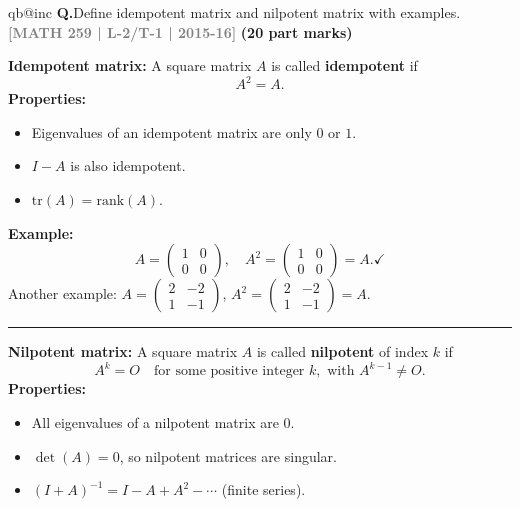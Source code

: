 \documentclass[12pt,a3paper]{article}
\makeatletter
\newcommand{\yr}[1]{\hfill\textcolor{gray}{\small\textbf{[#1]}}}
\newcommand{\mk}[1]{\textcolor{orange!70!black}{\small\textbf{(#1 marks)}}}
\newcounter{qnum}
\newcommand{\Q}[1]{%
  \csname qb@inc\endcsname
  \needspace{4\baselineskip}
  \refstepcounter{qnum}
  \vspace{6pt}
  \noindent\textbf{Q\theqnum.}\enspace #1\par
}
\makeatother
\begin{document}
\Q{Define idempotent matrix and nilpotent matrix with examples.
\yr{MATH 259 | L-2/T-1 | 2015-16} \mk{20 part}}

\begin{tcolorbox}[enhanced,breakable,
  colback=cA!4,colframe=cA,boxrule=0.8pt,arc=5pt,
  title={\textbf{Answer --- Idempotent and Nilpotent Matrices}},
  fonttitle=\bfseries\color{white},colbacktitle=cA]
 
\textbf{Idempotent matrix:} A square matrix $A$ is called \textbf{idempotent} if
\[
  A^2 = A.
\]
\textbf{Properties:}
\begin{itemize}[itemsep=2pt]
  \item Eigenvalues of an idempotent matrix are only $0$ or $1$.
  \item $I - A$ is also idempotent.
  \item $\mathrm{tr}(A) = \mathrm{rank}(A)$.
\end{itemize}
 
\textbf{Example:}
\[
  A = \begin{pmatrix}1 & 0 \\ 0 & 0\end{pmatrix}, \quad
  A^2 = \begin{pmatrix}1&0\\0&0\end{pmatrix} = A. \checkmark
\]
Another example: $A = \begin{pmatrix}2 & -2 \\ 1 & -1\end{pmatrix}$,
$A^2 = \begin{pmatrix}2&-2\\1&-1\end{pmatrix} = A$.
 
\medskip
\textcolor{cA}{\rule{\textwidth}{0.4pt}}
 
\textbf{Nilpotent matrix:} A square matrix $A$ is called \textbf{nilpotent} of index $k$ if
\[
  A^k = O \quad \text{for some positive integer } k, \text{ with } A^{k-1}\neq O.
\]
\textbf{Properties:}
\begin{itemize}[itemsep=2pt]
  \item All eigenvalues of a nilpotent matrix are $0$.
  \item $\det(A) = 0$, so nilpotent matrices are singular.
  \item $(I + A)^{-1} = I - A + A^2 - \cdots$ (finite series).
\end{itemize}
 

\end{tcolorbox}
\end{document}
